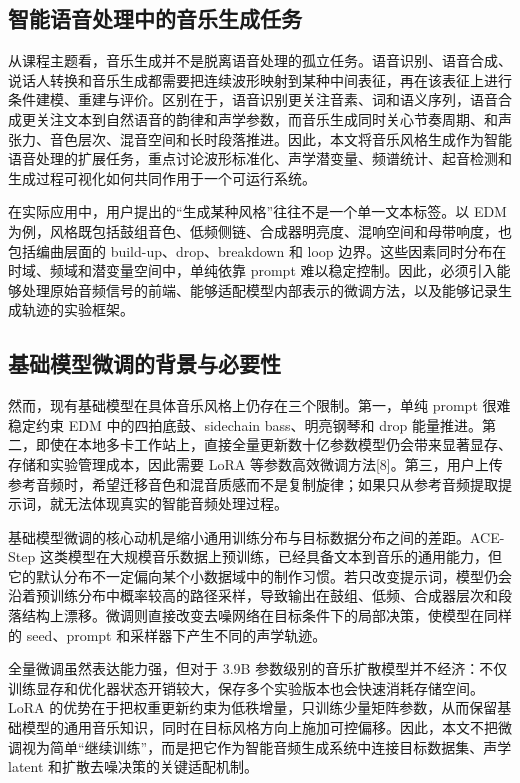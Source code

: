 \documentclass[UTF8,a4paper,zihao=-4,fontset=none]{ctexart}
\begin{document}
\subsection{智能语音处理中的音乐生成任务}
从课程主题看，音乐生成并不是脱离语音处理的孤立任务。语音识别、语音合成、说话人转换和音乐生成都需要把连续波形映射到某种中间表征，再在该表征上进行条件建模、重建与评价。区别在于，语音识别更关注音素、词和语义序列，语音合成更关注文本到自然语音的韵律和声学参数，而音乐生成同时关心节奏周期、和声张力、音色层次、混音空间和长时段落推进。因此，本文将音乐风格生成作为智能语音处理的扩展任务，重点讨论波形标准化、声学潜变量、频谱统计、起音检测和生成过程可视化如何共同作用于一个可运行系统。

在实际应用中，用户提出的“生成某种风格”往往不是一个单一文本标签。以 EDM 为例，风格既包括鼓组音色、低频侧链、合成器明亮度、混响空间和母带响度，也包括编曲层面的 build-up、drop、breakdown 和 loop 边界。这些因素同时分布在时域、频域和潜变量空间中，单纯依靠 prompt 难以稳定控制。因此，必须引入能够处理原始音频信号的前端、能够适配模型内部表示的微调方法，以及能够记录生成轨迹的实验框架。

\subsection{基础模型微调的背景与必要性}
然而，现有基础模型在具体音乐风格上仍存在三个限制。第一，单纯 prompt 很难稳定约束 EDM 中的四拍底鼓、sidechain bass、明亮钢琴和 drop 能量推进。第二，即使在本地多卡工作站上，直接全量更新数十亿参数模型仍会带来显著显存、存储和实验管理成本，因此需要 LoRA 等参数高效微调方法[8]。第三，用户上传参考音频时，希望迁移音色和混音质感而不是复制旋律；如果只从参考音频提取提示词，就无法体现真实的智能音频处理过程。

基础模型微调的核心动机是缩小通用训练分布与目标数据分布之间的差距。ACE-Step 这类模型在大规模音乐数据上预训练，已经具备文本到音乐的通用能力，但它的默认分布不一定偏向某个小数据域中的制作习惯。若只改变提示词，模型仍会沿着预训练分布中概率较高的路径采样，导致输出在鼓组、低频、合成器层次和段落结构上漂移。微调则直接改变去噪网络在目标条件下的局部决策，使模型在同样的 seed、prompt 和采样器下产生不同的声学轨迹。

全量微调虽然表达能力强，但对于 3.9B 参数级别的音乐扩散模型并不经济：不仅训练显存和优化器状态开销较大，保存多个实验版本也会快速消耗存储空间。LoRA 的优势在于把权重更新约束为低秩增量，只训练少量矩阵参数，从而保留基础模型的通用音乐知识，同时在目标风格方向上施加可控偏移。因此，本文不把微调视为简单“继续训练”，而是把它作为智能音频生成系统中连接目标数据集、声学 latent 和扩散去噪决策的关键适配机制。
\end{document}
